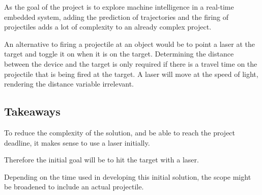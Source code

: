 As the goal of the project is to explore machine intelligence in a real-time embedded system, adding the prediction of trajectories and the firing of projectiles adds a lot of complexity to an already complex project.

An alternative to firing a projectile at an object would be to point a laser at the target and toggle it on when it is on the target.
Determining the distance between the device and the target is only required if there is a travel time on the projectile that is being fired at the target.
A laser will move at the speed of light, rendering the distance variable irrelevant.


\subsection{Takeaways}\label{anal:laser:takeaway}
To reduce the complexity of the solution, and be able to reach the project deadline, it makes sense to use a laser initially.

Therefore the initial goal will be to hit the target with a laser.

Depending on the time used in developing this initial solution, the scope might be broadened to include an actual projectile.
